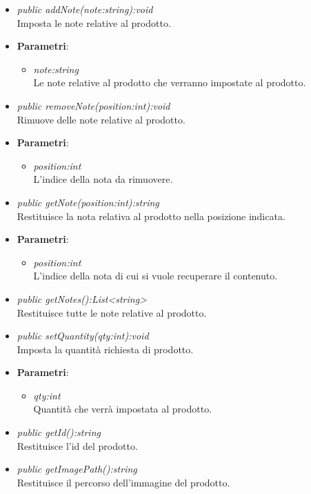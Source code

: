 \begin{itemize}
\begin{itemize}
	\item \textit{public addNote(note:string):void}\\
	Imposta le note relative al prodotto.
				\item{\textbf{Parametri}: \begin{itemize}
				\item \textit{note:string}\\
				Le note relative al prodotto che verranno impostate al prodotto.
			\end{itemize}}
	\item \textit{public removeNote(position:int):void}\\
	Rimuove delle note relative al prodotto.
				\item{\textbf{Parametri}: \begin{itemize}
				\item \textit{position:int}\\
				L'indice della nota da rimuovere.
			\end{itemize}}
	\item \textit{public getNote(position:int):string}\\
	Restituisce la nota relativa al prodotto nella posizione indicata.
				\item{\textbf{Parametri}: \begin{itemize}
				\item \textit{position:int}\\
				L'indice della nota di cui si vuole recuperare il contenuto.
			\end{itemize}}
	\item \textit{public getNotes():List<string>}\\
	Restituisce tutte le note relative al prodotto.
	\item \textit{public setQuantity(qty:int):void}\\
	Imposta la quantità richiesta di prodotto.
				\item{\textbf{Parametri}: \begin{itemize}
				\item \textit{qty:int}\\
				Quantità che verrà impostata al prodotto.
			\end{itemize}}
	\item \textit{public getId():string}\\
	Restituisce l'id del prodotto.
	\item \textit{public getImagePath():string}\\
	Restituisce il percorso dell'immagine del prodotto.

\end{itemize}
\end{itemize}
